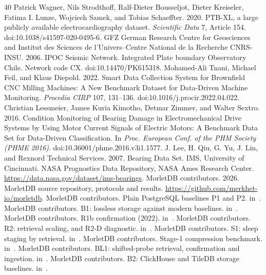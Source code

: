\documentclass[sigconf,nonacm]{acmart}
\newcommand{\M}{MorletDB}
\begin{document}
\begin{thebibliography}{40}
 Patrick Wagner, Nils Strodthoff, Ralf-Dieter Bousseljot, Dieter Kreiseler, Fatima I. Lunze, Wojciech Samek, and Tobias Schaeffter. 2020. PTB-XL, a large publicly available electrocardiography dataset. \emph{Scientific Data} 7, Article 154. doi:10.1038/s41597-020-0495-6.
 GFZ German Research Centre for Geosciences and Institut des Sciences de l'Univers--Centre National de la Recherche CNRS-INSU. 2006. IPOC Seismic Network. Integrated Plate boundary Observatory Chile. Network code CX. doi:10.14470/PK615318.
 Mohamed-Ali Tnani, Michael Feil, and Klaus Diepold. 2022. Smart Data Collection System for Brownfield CNC Milling Machines: A New Benchmark Dataset for Data-Driven Machine Monitoring. \emph{Procedia CIRP} 107, 131--136. doi:10.1016/j.procir.2022.04.022.
 Christian Lessmeier, James Kuria Kimotho, Detmar Zimmer, and Walter Sextro. 2016. Condition Monitoring of Bearing Damage in Electromechanical Drive Systems by Using Motor Current Signals of Electric Motors: A Benchmark Data Set for Data-Driven Classification. In \emph{Proc. European Conf. of the PHM Society (PHME 2016)}. doi:10.36001/phme.2016.v3i1.1577.
 J. Lee, H. Qiu, G. Yu, J. Lin, and Rexnord Technical Services. 2007. Bearing Data Set. IMS, University of Cincinnati. NASA Prognostics Data Repository, NASA Ames Research Center. \url{https://data.nasa.gov/dataset/ims-bearings}.
 \M{} contributors. 2026. \M{} source repository, protocols and results. \url{https://github.com/merkhet-io/morletdb}.
 \M{} contributors. Plain PostgreSQL baselines P1 and P2.  in~\cite{repo}.
 \M{} contributors. B1: lossless storage against modern baselines.  in~\cite{repo}.
 \M{} contributors. R1b confirmation (2022).  in~\cite{repo}.
 \M{} contributors. R2: retrieval scaling, and R2-D diagnostic.  in~\cite{repo}.
 \M{} contributors. S1: sleep staging by retrieval.  in~\cite{repo}.
 \M{} contributors. Stage-1 compression benchmark.  in~\cite{repo}.
 \M{} contributors. BL1: shifted-probe retrieval, confirmation and ingestion.  in~\cite{repo}.
 \M{} contributors. B2: ClickHouse and TileDB storage baselines.  in~\cite{repo}.

\end{thebibliography}
\end{document}
